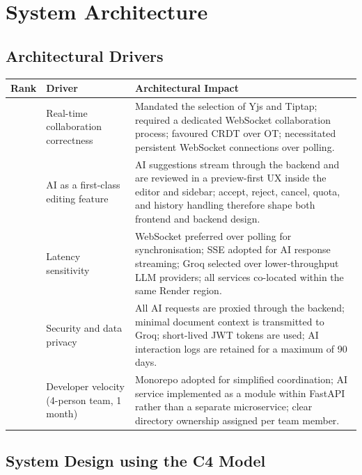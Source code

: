 \documentclass{article}
\begin{document}
\section{System Architecture}
\subsection{Architectural Drivers}
\noindent
{\small
\begin{tabularx}{\textwidth}{|>{\hsize=0.2\hsize\raggedright\arraybackslash}X|>{\hsize=0.6\hsize\raggedright\arraybackslash}X|>{\hsize=1.2\hsize\raggedright\arraybackslash}X|}
    \hline
    \rowcolor{tableBlue}
    \textbf{\color{white}Rank} &
    \textbf{\color{white}Driver} &
    \textbf{\color{white}Architectural Impact} \\
    \hline
    1 & Real-time collaboration correctness & Mandated the selection of Yjs and Tiptap; required a dedicated WebSocket collaboration process; favoured CRDT over OT; necessitated persistent WebSocket connections over polling. \\
    \hline
    2 & AI as a first-class editing feature & AI suggestions stream through the backend and are reviewed in a preview-first UX inside the editor and sidebar; accept, reject, cancel, quota, and history handling therefore shape both frontend and backend design. \\
    \hline
    3 & Latency sensitivity & WebSocket preferred over polling for synchronisation; SSE adopted for AI response streaming; Groq selected over lower-throughput LLM providers; all services co-located within the same Render region. \\
    \hline
    4 & Security and data privacy & All AI requests are proxied through the backend; minimal document context is transmitted to Groq; short-lived JWT tokens are used; AI interaction logs are retained for a maximum of 90 days. \\
    \hline
    5 & Developer velocity (4-person team, 1 month) & Monorepo adopted for simplified coordination; AI service implemented as a module within FastAPI rather than a separate microservice; clear directory ownership assigned per team member. \\
    \hline
\end{tabularx}
}

\subsection{System Design using the C4 Model}
\end{document}
